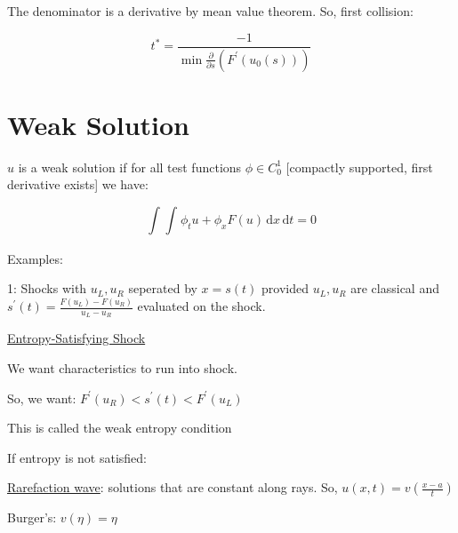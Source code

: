 \documentclass{article}
\theoremstyle{definition}
\begin{document}
The denominator is a derivative by mean value theorem. So, first collision:

\[
    t^{\ast} = \frac{-1}{\min \frac{\partial}{\partial s} (F^{\prime}(u_0(s)))}
\]

\section*{Weak Solution}

\(u\) is a weak solution if for all test functions \(\phi\in C^1_0\) [compactly supported, first derivative exists] we have:

\[
    \int_{}^{} \int_{}^{} \phi_t u + \phi_x F(u) \,\mathrm{d}x  \,\mathrm{d}t = 0
\]

Examples:

1: Shocks with \(u_L, u_R\) seperated by \(x=s(t)\) provided \(u_L, u_R\) are classical and \(s^{\prime} (t) = \frac{F(u_L)-F(u_R)}{u_L - u_R}\) evaluated on the shock. 

\underline{Entropy-Satisfying Shock}

We want characteristics to run into shock.

So, we want: \(F^{\prime} (u_R) < s^{\prime} (t) < F^{\prime} (u_L)\) 

This is called the weak entropy condition

If entropy is not satisfied:

\underline{Rarefaction wave}: solutions that are constant along rays. So, \(u(x,t) = v(\frac{x - a}{t})\) 

Burger's: \(v(\eta)=\eta\) 
\end{document}
